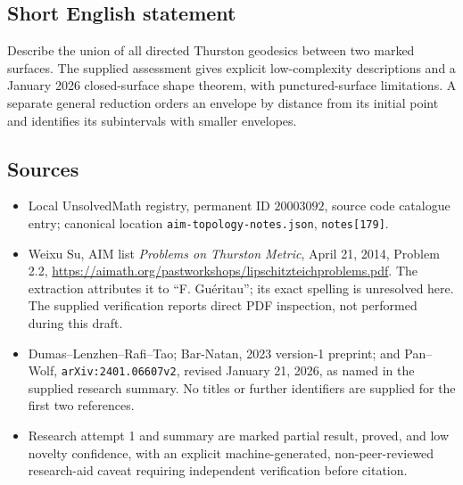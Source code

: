 \documentclass[11pt]{article}
\begin{document}
\subsection{Short English statement}
Describe the union of all directed Thurston geodesics between two marked surfaces. The supplied assessment gives explicit low-complexity descriptions and a January 2026 closed-surface shape theorem, with punctured-surface limitations. A separate general reduction orders an envelope by distance from its initial point and identifies its subintervals with smaller envelopes.
\subsection{Sources}
\begin{itemize}
\item Local UnsolvedMath registry, permanent ID $20003092$, source code catalogue entry; canonical location \texttt{aim-topology-notes.json}, \texttt{notes[179]}.
\item Weixu Su, AIM list \emph{Problems on Thurston Metric}, April 21, 2014, Problem 2.2, \url{https://aimath.org/pastworkshops/lipschitzteichproblems.pdf}. The extraction attributes it to ``F. Gu\'eritau''; its exact spelling is unresolved here. The supplied verification reports direct PDF inspection, not performed during this draft.
\item Dumas--Lenzhen--Rafi--Tao; Bar-Natan, 2023 version-1 preprint; and Pan--Wolf, \texttt{arXiv:2401.06607v2}, revised January 21, 2026, as named in the supplied research summary. No titles or further identifiers are supplied for the first two references.
\item Research attempt 1 and summary are marked partial result, proved, and low novelty confidence, with an explicit machine-generated, non-peer-reviewed research-aid caveat requiring independent verification before citation.
\end{itemize}
\end{document}
